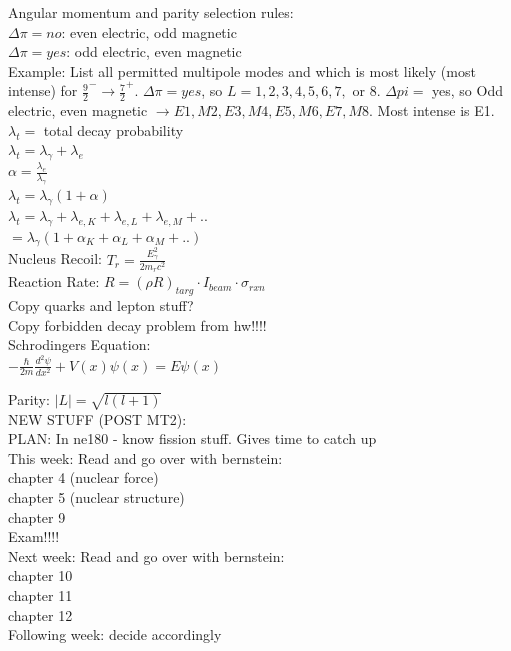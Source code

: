 \documentclass{article}
\begin{document}
\begin{multicols}{3}
Angular momentum and parity selection rules:\\
$\Delta \pi = no$: even electric, odd magnetic\\
$\Delta \pi = yes$: odd electric, even magnetic\\

Example: List all permitted multipole modes and which is most likely (most intense) for $\frac{9}{2}^{-} \rightarrow \frac{7}{2}^{+}$.  $\Delta \pi = yes$, so $L = 1,2,3,4,5,6,7,$ or $8$.  $\Delta pi = $ yes, so Odd electric, even magnetic $ \rightarrow E1, M2, E3, M4, E5, M6, E7, M8$.  Most intense is E1.\\
$\lambda_{t} =$ total decay probability\\
$\lambda_{t} = \lambda_{\gamma} + \lambda_{e}$\\
$\alpha = \frac{\lambda_{e}}{\lambda_{\gamma}}$\\
$\lambda_{t} = \lambda_{\gamma}(1+\alpha)$\\
$\lambda_{t} = \lambda_{\gamma} + \lambda_{e,K} + \lambda_{e,L} + \lambda_{e,M} + ..$\\$ = \lambda_{\gamma}(1 + \alpha_{K} + \alpha_{L} + \alpha_{M} + ..)$\\
Nucleus Recoil: $T_{r} = \frac{E_{\gamma}^{2}}{2m_{r}c^{2}}$\\
Reaction Rate: $R = (\rho R)_{targ} \cdot I_{beam} \cdot \sigma_{rxn}$\\

Copy quarks and lepton stuff?\\
Copy forbidden decay problem from hw!!!!\\

Schrodingers Equation:\\
$-\frac{\hbar}{2m}\frac{d^{2}\psi}{dx^{2}} + V(x)\psi(x) = E\psi(x)$

Parity:  $|L| = \sqrt{l(l+1)}$\\

NEW STUFF (POST MT2):\\

PLAN:
In ne180 - know fission stuff.  Gives time to catch up\\
This week:  Read and go over with bernstein:\\
\hspace*{0.01\textwidth} chapter 4 (nuclear force)\\
\hspace*{0.01\textwidth} chapter 5 (nuclear structure)\\
\hspace*{0.01\textwidth} chapter 9\\
\hspace*{0.01\textwidth} Exam!!!!\\
Next week:  Read and go over with bernstein:\\
\hspace*{0.01\textwidth} chapter 10\\
\hspace*{0.01\textwidth} chapter 11\\
\hspace*{0.01\textwidth} chapter 12\\
Following week: decide accordingly\\


\end{multicols}
\end{document}

